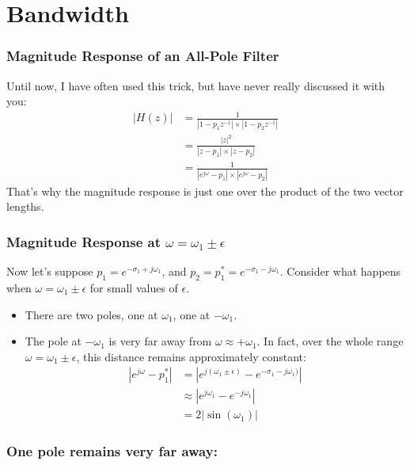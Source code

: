 \documentclass{beamer}
\begin{document}
\begin{frame}
  \centerline{}
\end{frame}
  

\section[Bandwidth]{Bandwidth}
\setcounter{subsection}{1}

\begin{frame}
  \frametitle{Magnitude Response of an All-Pole Filter}

  Until now, I have often used this trick, but have never really
  discussed it with you:
  \begin{align*}
    |H(z)| &= \frac{1}{|1-p_1z^{-1}|\times |1-p_2z^{-1}|}\\
    &= \frac{|z|^2}{|z-p_1|\times |z-p_2|} \\
    & =\frac{1}{|e^{j\omega}-p_1|\times |e^{j\omega}-p_2|}
  \end{align*}
  That's why the magnitude response is just one over the product of the two vector lengths.
\end{frame}

\begin{frame}
  \frametitle{Magnitude Response at $\omega=\omega_1\pm\epsilon$}

  Now let's suppose $p_1=e^{-\sigma_1+j\omega_1}$, and
  $p_2=p_1^*=e^{-\sigma_1-j\omega_1}$.  Consider what happens when
  $\omega=\omega_1\pm\epsilon$ for small values of $\epsilon$.
  \begin{itemize}
  \item There are two poles, one at $\omega_1$, one at $-\omega_1$.
  \item The pole at $-\omega_1$ is very far away from $\omega\approx +\omega_1$.
    In fact, over the whole range $\omega=\omega_1\pm\epsilon$, this distance
    remains approximately constant:
    \begin{align*}
      |e^{j\omega}-p_1^*|&= |e^{j(\omega_1\pm\epsilon)}-e^{-\sigma_1-j\omega_1)}|\\
      &\approx |e^{j\omega_1}-e^{-j\omega_1}|\\
      &= 2|\sin(\omega_1)|
    \end{align*}
  \end{itemize}
\end{frame}  

\begin{frame}
  \frametitle{One pole remains very far away:}
  \centerline{}
\end{frame}
\end{document}
